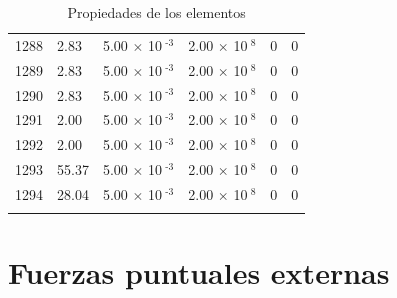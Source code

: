 \documentclass[a4paper,11pt]{article}
\begin{document}
\begin{center}
\begin{longtable}{|R{1.5cm}|R{2.4cm}|R{2.4cm}|R{2.4cm}|R{2.4cm}|R{2.4cm}|}
 1288 &   2.83  &         5.00 $\times$ 10$^{\text{          -3}}$  &         2.00 $\times$ 10$^{\text{           8}}$  & 0  & 0 \\
 1289 &   2.83  &         5.00 $\times$ 10$^{\text{          -3}}$  &         2.00 $\times$ 10$^{\text{           8}}$  & 0  & 0 \\
 1290 &   2.83  &         5.00 $\times$ 10$^{\text{          -3}}$  &         2.00 $\times$ 10$^{\text{           8}}$  & 0  & 0 \\
 1291 &   2.00  &         5.00 $\times$ 10$^{\text{          -3}}$  &         2.00 $\times$ 10$^{\text{           8}}$  & 0  & 0 \\
 1292 &   2.00  &         5.00 $\times$ 10$^{\text{          -3}}$  &         2.00 $\times$ 10$^{\text{           8}}$  & 0  & 0 \\
 1293 &  55.37  &         5.00 $\times$ 10$^{\text{          -3}}$  &         2.00 $\times$ 10$^{\text{           8}}$  & 0  & 0 \\
 1294 &  28.04  &         5.00 $\times$ 10$^{\text{          -3}}$  &         2.00 $\times$ 10$^{\text{           8}}$  & 0  & 0 \\
\bottomrule[0.8mm]                               
\caption{Propiedades de los elementos}             
\end{longtable}                                  
\end{center}                                     

\newpage   

\section{Fuerzas puntuales externas}             
\end{document}
